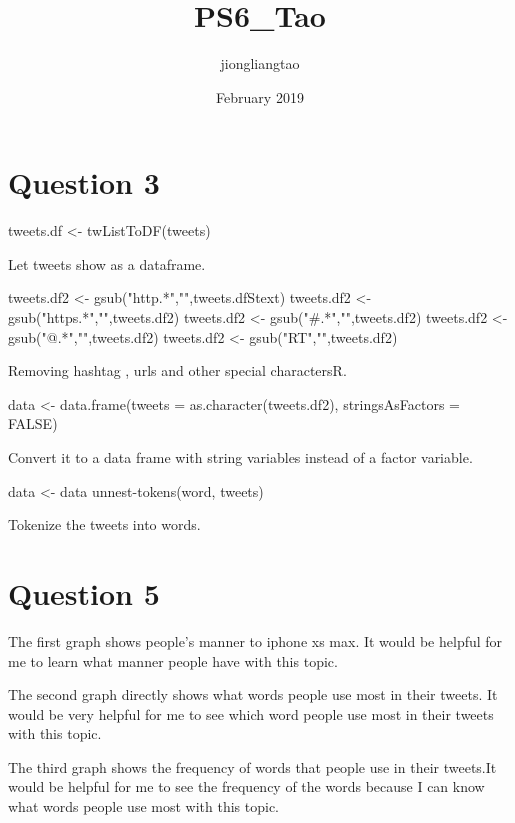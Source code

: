 \documentclass{article}
\title{PS6_Tao}
\author{jiongliangtao }
\date{February 2019}
\begin{document}
\maketitle

\section{Question 3}
tweets.df <- twListToDF(tweets) 

Let tweets show as a dataframe. 

tweets.df2 <- gsub("http.*","",tweets.dfStext)
tweets.df2 <- gsub("https.*","",tweets.df2)
tweets.df2 <- gsub("#.*","",tweets.df2)
tweets.df2 <- gsub("@.*","",tweets.df2)
tweets.df2 <- gsub("RT","",tweets.df2)

Removing hashtag , urls and other special charactersR.

data <- data.frame(tweets = as.character(tweets.df2), 
                   stringsAsFactors = FALSE)
                   
Convert it to a data frame with string variables instead of a factor variable.

data <- data %
    unnest-tokens(word, tweets)
    
Tokenize the tweets into words.

\section{Question 5}
The first graph shows people's manner to iphone xs max. It would be helpful for me to learn what manner people have with this topic. 

The second graph directly shows what words people use most in their tweets. It would be very helpful for me to see which word people use most in their tweets with this topic. 

The third graph shows the frequency of words that people use in their tweets.It would be helpful for me to see the frequency of the words because I can know what words people use most with this topic. 
\end{document}
